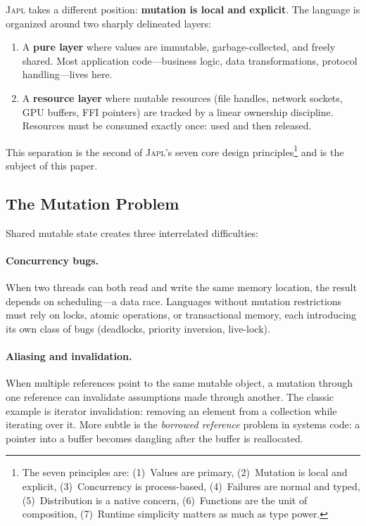 \documentclass[11pt]{article}
\newcommand{\JAPL}{\textsc{Japl}}
\begin{document}
\JAPL{} takes a different position: \textbf{mutation is local and
explicit}.  The language is organized around two sharply delineated
layers:

\begin{enumerate}[label=(\roman*)]
  \item A \textbf{pure layer} where values are immutable, garbage-collected,
        and freely shared.  Most application code---business logic,
        data transformations, protocol handling---lives here.
  \item A \textbf{resource layer} where mutable resources (file handles,
        network sockets, GPU buffers, FFI pointers) are tracked by a
        linear ownership discipline.  Resources must be consumed exactly
        once: used and then released.
\end{enumerate}

This separation is the second of \JAPL{}'s seven core design
principles\footnote{The seven principles are: (1)~Values are primary,
(2)~Mutation is local and explicit, (3)~Concurrency is process-based,
(4)~Failures are normal and typed, (5)~Distribution is a native
concern, (6)~Functions are the unit of composition,
(7)~Runtime simplicity matters as much as type power.} and is the
subject of this paper.

\subsection{The Mutation Problem}

Shared mutable state creates three interrelated difficulties:

\paragraph{Concurrency bugs.}
When two threads can both read and write the same memory location, the
result depends on scheduling---a data race.  Languages without
mutation restrictions must rely on locks, atomic operations, or
transactional memory, each introducing its own class of bugs
(deadlocks, priority inversion, live-lock).

\paragraph{Aliasing and invalidation.}
When multiple references point to the same mutable object, a mutation
through one reference can invalidate assumptions made through another.
The classic example is iterator invalidation: removing an element from
a collection while iterating over it.  More subtle is the
\emph{borrowed reference} problem in systems code: a pointer into a
buffer becomes dangling after the buffer is reallocated.
\end{document}
